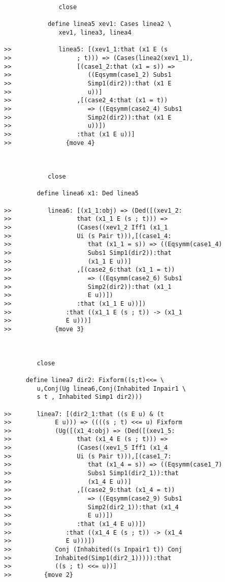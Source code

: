 \documentclass[12pt]{article}
\begin{document}
\begin{verbatim}
               close

            define linea5 xev1: Cases linea2 \
               xev1, linea3, linea4

>>             linea5: [(xev1_1:that (x1 E (s
>>                  ; t))) => (Cases(linea2(xev1_1),
>>                  [(case1_2:that (x1 = s)) =>
>>                     ((Eqsymm(case1_2) Subs1
>>                     Simp1(dir2)):that (x1 E
>>                     u))]
>>                  ,[(case2_4:that (x1 = t))
>>                     => ((Eqsymm(case2_4) Subs1
>>                     Simp2(dir2)):that (x1 E
>>                     u))])
>>                  :that (x1 E u))]
>>               {move 4}



            close

         define linea6 x1: Ded linea5

>>          linea6: [(x1_1:obj) => (Ded([(xev1_2:
>>                  that (x1_1 E (s ; t))) =>
>>                  (Cases((xev1_2 Iff1 (x1_1
>>                  Ui (s Pair t))),[(case1_4:
>>                     that (x1_1 = s)) => ((Eqsymm(case1_4)
>>                     Subs1 Simp1(dir2)):that
>>                     (x1_1 E u))]
>>                  ,[(case2_6:that (x1_1 = t))
>>                     => ((Eqsymm(case2_6) Subs1
>>                     Simp2(dir2)):that (x1_1
>>                     E u))])
>>                  :that (x1_1 E u))])
>>               :that ((x1_1 E (s ; t)) -> (x1_1
>>               E u)))]
>>            {move 3}



         close

      define linea7 dir2: Fixform((s;t)<<= \
         u,Conj(Ug linea6,Conj(Inhabited Inpair1 \
         s t , Inhabited Simp1 dir2)))

>>       linea7: [(dir2_1:that ((s E u) & (t
>>            E u))) => ((((s ; t) <<= u) Fixform
>>            (Ug([(x1_4:obj) => (Ded([(xev1_5:
>>                  that (x1_4 E (s ; t))) =>
>>                  (Cases((xev1_5 Iff1 (x1_4
>>                  Ui (s Pair t))),[(case1_7:
>>                     that (x1_4 = s)) => ((Eqsymm(case1_7)
>>                     Subs1 Simp1(dir2_1)):that
>>                     (x1_4 E u))]
>>                  ,[(case2_9:that (x1_4 = t))
>>                     => ((Eqsymm(case2_9) Subs1
>>                     Simp2(dir2_1)):that (x1_4
>>                     E u))])
>>                  :that (x1_4 E u))])
>>               :that ((x1_4 E (s ; t)) -> (x1_4
>>               E u)))])
>>            Conj (Inhabited((s Inpair1 t)) Conj
>>            Inhabited(Simp1(dir2_1))))):that
>>            ((s ; t) <<= u))]
>>         {move 2}




\end{verbatim}
\end{document}
